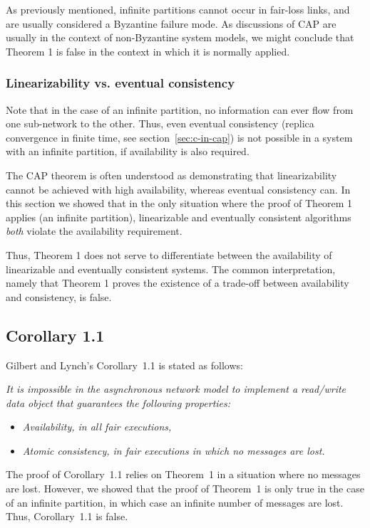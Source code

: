 \documentclass[a4paper,twocolumn,10pt]{article}
\begin{document}
As previously mentioned, infinite partitions cannot occur in fair-loss links, and are usually
considered a Byzantine failure mode. As discussions of CAP are usually in the context of
non-Byzantine system models, we might conclude that Theorem 1 is false in the context in which it is
normally applied.

\subsubsection{Linearizability vs. eventual consistency}

Note that in the case of an infinite partition, no information can ever flow from one sub-network to
the other. Thus, even eventual consistency (replica convergence in finite time, see
section~\ref{sec:c-in-cap}) is not possible in a system with an infinite partition, if availability
is also required.

The CAP theorem is often understood as demonstrating that linearizability cannot be achieved with
high availability, whereas eventual consistency can. In this section we showed that in the only
situation where the proof of Theorem 1 applies (an infinite partition), linearizable and eventually
consistent algorithms \emph{both} violate the availability requirement.

Thus, Theorem 1 does not serve to differentiate between the availability of linearizable and
eventually consistent systems. The common interpretation, namely that Theorem 1 proves the existence
of a trade-off between availability and consistency, is false.

\subsection{Corollary 1.1}\label{sec:corollary}

Gilbert and Lynch's Corollary~1.1 is stated as follows:

\emph{It is impossible in the asynchronous network model to implement a read/write data object that
guarantees the following properties:}
\begin{itemize}
\item \emph{Availability, in all fair executions,}
\item \emph{Atomic consistency, in fair executions in which \emph{no} messages are lost.}
\end{itemize}

The proof of Corollary~1.1 relies on Theorem~1 in a situation where no messages are lost. However,
we showed that the proof of Theorem~1 is only true in the case of an infinite partition, in which
case an infinite number of messages are lost. Thus, Corollary~1.1 is false.
\end{document}
